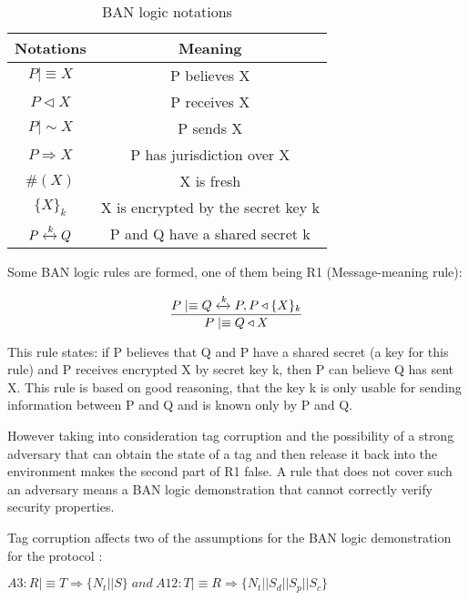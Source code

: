     \newcommand{\believes}{\mid\equiv}
    \newcommand{\receives}{\triangleleft}
    \newcommand{\sends}{\mid\sim}
    \newcommand{\controls}{\Rightarrow}
    \newcommand{\fresh}[1]{\#(#1)}
    \newcommand{\encrypt}[2]{\{#1\}_{#2}}
    \newcommand{\sharesecret}[1]{\xleftrightarrow{#1}}

    \begin{table}[H]
    \centering
    \caption{BAN logic notations}
    \begin{tabular}{| c | c |}
        \hline
        Notations & Meaning \\
        \hline
        $P \believes X$ & P believes X \\
        $P \receives X$ & P receives X \\
        $P \sends X$ & P sends X \\
        $P \controls X$ & P has jurisdiction over X \\
        $ \fresh{X} $ & X is fresh \\
        $ \encrypt{X}{k} $ & X is encrypted by the secret key k \\
        $ P \sharesecret{k} Q $ & P and Q have a shared secret k \\
        \hline
    \end{tabular}
    \end{table}

    Some BAN logic rules are formed, one of them being R1 (Message-meaning rule): 
    
    \[
    \frac{P \believes Q \sharesecret{k} P, P \receives \encrypt{X}{k}}{P \believes Q \receives X}
    \]
    
    This rule states: if P believes that Q and P have a shared secret (a key for this rule) and P receives encrypted X by secret key k, then
    P can believe Q has sent X. This rule is based on good reasoning, that the key k is only usable for sending information between P and Q 
    and is known only by P and Q.

    However taking into consideration tag corruption and the possibility of a strong adversary that can obtain the state of a tag and then
    release it back into the environment makes the second part of R1 false. A rule that does not cover such an adversary means a BAN
    logic demonstration that cannot correctly verify security properties.
    
    Tag corruption affects two of the assumptions for the BAN logic demonstration for the protocol \cite{BOM}:

    \begin{center}
        $ A3: R \believes T \controls \encrypt{N_t||S}{}\ and\ A12: T \believes R \controls \{N_t||S_d||S_p||S_c\} $
    \end{center}

